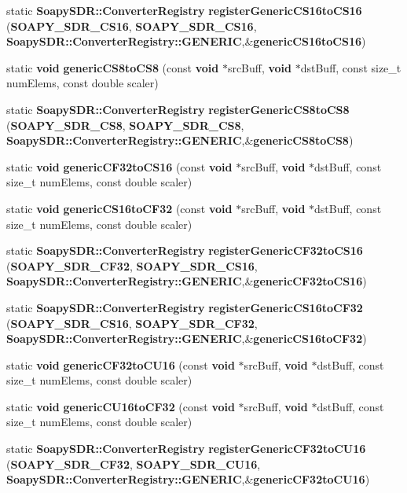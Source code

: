 \begin{DoxyCompactItemize}
\item 
static {\bf Soapy\+S\+D\+R\+::\+Converter\+Registry} {\bf register\+Generic\+C\+S16to\+C\+S16} ({\bf S\+O\+A\+P\+Y\+\_\+\+S\+D\+R\+\_\+\+C\+S16}, {\bf S\+O\+A\+P\+Y\+\_\+\+S\+D\+R\+\_\+\+C\+S16}, {\bf Soapy\+S\+D\+R\+::\+Converter\+Registry\+::\+G\+E\+N\+E\+R\+IC},\&{\bf generic\+C\+S16to\+C\+S16})
\item 
static {\bf void} {\bf generic\+C\+S8to\+C\+S8} (const {\bf void} $\ast$src\+Buff, {\bf void} $\ast$dst\+Buff, const size\+\_\+t num\+Elems, const double scaler)
\item 
static {\bf Soapy\+S\+D\+R\+::\+Converter\+Registry} {\bf register\+Generic\+C\+S8to\+C\+S8} ({\bf S\+O\+A\+P\+Y\+\_\+\+S\+D\+R\+\_\+\+C\+S8}, {\bf S\+O\+A\+P\+Y\+\_\+\+S\+D\+R\+\_\+\+C\+S8}, {\bf Soapy\+S\+D\+R\+::\+Converter\+Registry\+::\+G\+E\+N\+E\+R\+IC},\&{\bf generic\+C\+S8to\+C\+S8})
\item 
static {\bf void} {\bf generic\+C\+F32to\+C\+S16} (const {\bf void} $\ast$src\+Buff, {\bf void} $\ast$dst\+Buff, const size\+\_\+t num\+Elems, const double scaler)
\item 
static {\bf void} {\bf generic\+C\+S16to\+C\+F32} (const {\bf void} $\ast$src\+Buff, {\bf void} $\ast$dst\+Buff, const size\+\_\+t num\+Elems, const double scaler)
\item 
static {\bf Soapy\+S\+D\+R\+::\+Converter\+Registry} {\bf register\+Generic\+C\+F32to\+C\+S16} ({\bf S\+O\+A\+P\+Y\+\_\+\+S\+D\+R\+\_\+\+C\+F32}, {\bf S\+O\+A\+P\+Y\+\_\+\+S\+D\+R\+\_\+\+C\+S16}, {\bf Soapy\+S\+D\+R\+::\+Converter\+Registry\+::\+G\+E\+N\+E\+R\+IC},\&{\bf generic\+C\+F32to\+C\+S16})
\item 
static {\bf Soapy\+S\+D\+R\+::\+Converter\+Registry} {\bf register\+Generic\+C\+S16to\+C\+F32} ({\bf S\+O\+A\+P\+Y\+\_\+\+S\+D\+R\+\_\+\+C\+S16}, {\bf S\+O\+A\+P\+Y\+\_\+\+S\+D\+R\+\_\+\+C\+F32}, {\bf Soapy\+S\+D\+R\+::\+Converter\+Registry\+::\+G\+E\+N\+E\+R\+IC},\&{\bf generic\+C\+S16to\+C\+F32})
\item 
static {\bf void} {\bf generic\+C\+F32to\+C\+U16} (const {\bf void} $\ast$src\+Buff, {\bf void} $\ast$dst\+Buff, const size\+\_\+t num\+Elems, const double scaler)
\item 
static {\bf void} {\bf generic\+C\+U16to\+C\+F32} (const {\bf void} $\ast$src\+Buff, {\bf void} $\ast$dst\+Buff, const size\+\_\+t num\+Elems, const double scaler)
\item 
static {\bf Soapy\+S\+D\+R\+::\+Converter\+Registry} {\bf register\+Generic\+C\+F32to\+C\+U16} ({\bf S\+O\+A\+P\+Y\+\_\+\+S\+D\+R\+\_\+\+C\+F32}, {\bf S\+O\+A\+P\+Y\+\_\+\+S\+D\+R\+\_\+\+C\+U16}, {\bf Soapy\+S\+D\+R\+::\+Converter\+Registry\+::\+G\+E\+N\+E\+R\+IC},\&{\bf generic\+C\+F32to\+C\+U16})

\end{DoxyCompactItemize}
